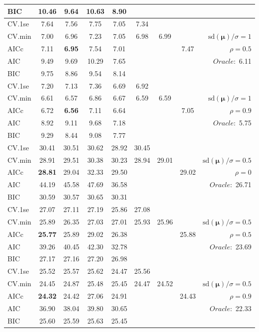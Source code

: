 \begin{table}
\begin{center}
\begin{tabular}{l*{7}{c}|r}
BIC & 10.46 & 9.64 & 10.63 & 8.90 & & & &  \\
 \hline 
CV.1se & 7.64 & 7.56 & 7.75 & 7.05 & 7.34 & & & \\
CV.min & 7.00 & 6.96 & 7.23 & 7.05 & 6.98 & 6.99 & & $\mathrm{sd}(\mathbf{\mu})/\sigma=1$ \\
AICc & 7.11 & {\bf 6.95} & 7.54 & 7.01 & & & 7.47 &  $\rho=0.5$ \\
AIC & 9.49 & 9.69 & 10.29 & 7.65 & & & &  \multirow{2}{*}{$Oracle: $ 6.11} \\
BIC & 9.75 & 8.86 & 9.54 & 8.14 & & & &  \\
 \hline 
CV.1se & 7.20 & 7.13 & 7.36 & 6.69 & 6.92 & & & \\
CV.min & 6.61 & 6.57 & 6.86 & 6.67 & 6.59 & 6.59 & & $\mathrm{sd}(\mathbf{\mu})/\sigma=1$ \\
AICc & 6.72 & {\bf 6.56} & 7.11 & 6.64 & & & 7.05 &  $\rho=0.9$ \\
AIC & 8.92 & 9.11 & 9.68 & 7.18 & & & &  \multirow{2}{*}{$Oracle: $ 5.75} \\
BIC & 9.29 & 8.44 & 9.08 & 7.77 & & & &  \\
 \hline 
CV.1se & 30.41 & 30.51 & 30.62 & 28.92 & 30.45 & & & \\
CV.min & 28.91 & 29.51 & 30.38 & 30.23 & 28.94 & 29.01 & & $\mathrm{sd}(\mathbf{\mu})/\sigma=0.5$ \\
AICc & {\bf 28.81} & 29.04 & 32.33 & 29.50 & & & 29.02 &  $\rho=0$ \\
AIC & 44.19 & 45.58 & 47.69 & 36.58 & & & &  \multirow{2}{*}{$Oracle: $ 26.71} \\
BIC & 30.59 & 30.57 & 30.65 & 30.31 & & & &  \\
 \hline 
CV.1se & 27.07 & 27.11 & 27.19 & 25.86 & 27.08 & & & \\
CV.min & 25.89 & 26.35 & 27.03 & 27.01 & 25.93 & 25.96 & & $\mathrm{sd}(\mathbf{\mu})/\sigma=0.5$ \\
AICc & {\bf 25.77} & 25.89 & 29.02 & 26.38 & & & 25.88 &  $\rho=0.5$ \\
AIC & 39.26 & 40.45 & 42.30 & 32.78 & & & &  \multirow{2}{*}{$Oracle: $ 23.69} \\
BIC & 27.17 & 27.16 & 27.20 & 26.98 & & & &  \\
 \hline 
CV.1se & 25.52 & 25.57 & 25.62 & 24.47 & 25.56 & & & \\
CV.min & 24.45 & 24.87 & 25.48 & 25.45 & 24.47 & 24.52 & & $\mathrm{sd}(\mathbf{\mu})/\sigma=0.5$ \\
AICc & {\bf 24.32} & 24.42 & 27.06 & 24.91 & & & 24.43 &  $\rho=0.9$ \\
AIC & 36.90 & 38.04 & 39.80 & 30.65 & & & &  \multirow{2}{*}{$Oracle: $ 22.33} \\
BIC & 25.60 & 25.59 & 25.63 & 25.45 & & & &  \\
 \hline 
\end{tabular}
\end{center}
\vspace{-1cm}
\end{table}





